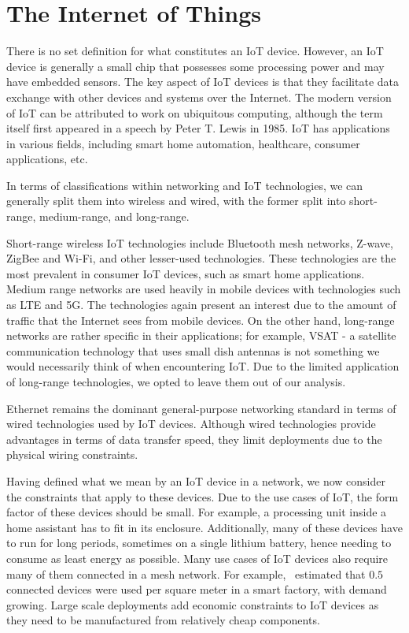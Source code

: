 \section{The Internet of Things}

There is no set definition for what constitutes an IoT device. 
However, an IoT device is generally a small chip that possesses some processing power and may have embedded sensors.
The key aspect of IoT devices is that they facilitate data exchange with other devices and systems over the Internet.
The modern version of IoT can be attributed to work on ubiquitous computing, although the term itself first appeared in a speech by Peter T. Lewis in 1985.
IoT has applications in various fields, including smart home automation, healthcare, consumer applications, etc.

In terms of classifications within networking and IoT technologies, we can generally split them into wireless and wired, with the former split into short-range, medium-range, and long-range.

Short-range wireless IoT technologies include Bluetooth mesh networks, Z-wave, ZigBee and Wi-Fi, and other lesser-used technologies.
These technologies are the most prevalent in consumer IoT devices, such as smart home applications.
Medium range networks are used heavily in mobile devices with technologies such as LTE and 5G.
The technologies again present an interest due to the amount of traffic that the Internet sees from mobile devices.
On the other hand, long-range networks are rather specific in their applications; for example, VSAT - a satellite communication technology that uses small dish antennas is not something we would necessarily think of when encountering IoT.
Due to the limited application of long-range technologies, we opted to leave them out of our analysis.

Ethernet remains the dominant general-purpose networking standard in terms of wired technologies used by IoT devices.
Although wired technologies provide advantages in terms of data transfer speed, they limit deployments due to the physical wiring constraints.

Having defined what we mean by an IoT device in a network, we now consider the constraints that apply to these devices.
Due to the use cases of IoT, the form factor of these devices should be small.
For example, a processing unit inside a home assistant has to fit in its enclosure.
Additionally, many of these devices have to run for long periods, sometimes on a single lithium battery, hence needing to consume as least energy as possible.
Many use cases of IoT devices also require many of them connected in a mesh network.
For example,~\cite{ericsson_iot_2018} estimated that $0.5$ connected devices were used per square meter in a smart factory, with demand growing.
Large scale deployments add economic constraints to IoT devices as they need to be manufactured from relatively cheap components.

